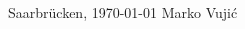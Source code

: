 \documentclass[11pt, a4paper, twoside]{Thesis}
\newcommand{\listofalgorithmes}{\tocfile{\listalgorithmcfname}{loa}}
\begin{document}
\begin{flushright}
\noindent Saarbr\"{u}cken, \today
\hfill
Marko Vuji\'c
\end{flushright}

\clearpage  %





\clearpage  %

\thispagestyle{empty}

\begin{spacing}{0.1}
\pagestyle{fancy}
\tableofcontents
\listoffigures
\listoftables
\end{spacing}

\clearpage

\mainmatter

%

%
%
%
%
%
%
%
%
%
%
%
%



{\small}
\clearpage

\appendix


%
\end{document}

